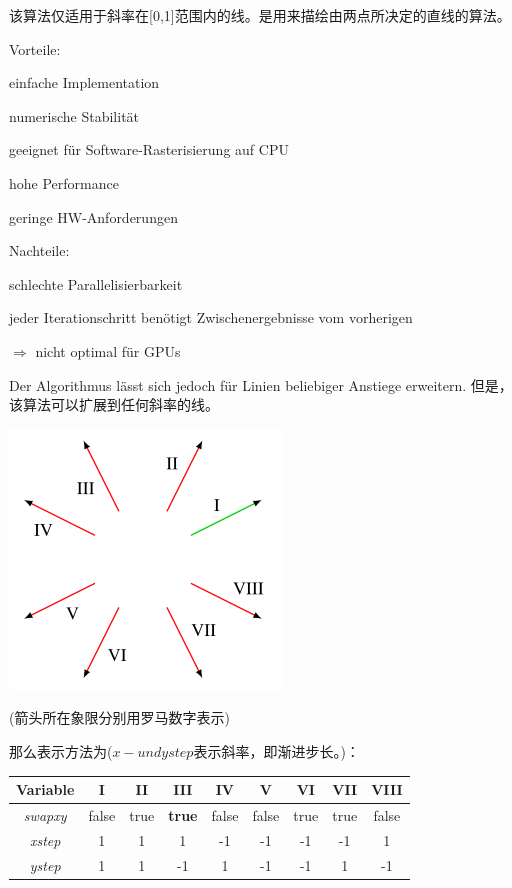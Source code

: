 \documentclass[fleqn]{article}
\begin{document}
\noindent 该算法仅适用于斜率在[0,1]范围内的线。是用来描绘由两点所决定的直线的算法。

\noindent Vorteile:

einfache Implementation 

numerische Stabilität 

geeignet für Software-Rasterisierung auf CPU 

  \indent\indent hohe Performance 

  \indent\indent geringe HW-Anforderungen

\noindent Nachteile:

schlechte Parallelisierbarkeit 

\indent\indent jeder Iterationschritt benötigt Zwischenergebnisse vom vorherigen

\indent\indent\indent $\Rightarrow$ nicht optimal für GPUs

\noindent Der Algorithmus lässt sich jedoch für Linien beliebiger Anstiege erweitern. 但是，该算法可以扩展到任何斜率的线。

\begin{center}
    \includegraphics[scale=0.6]{1.png}
\end{center}

(箭头所在象限分别用罗马数字表示)

那么表示方法为($x- und ystep$表示斜率，即渐进步长。)：

\begin{center}
    \begin{tabular}{c|c|c|c|c|c|c|c|c}
        Variable &I&II&III&IV&V&VI&VII&VIII\\
        \hline
        \hline
        \textit{swapxy}&false&true&\textbf{true}&false&false&true&true&false\\
        \hline
        \textit{xstep}&1&1&1&-1&-1&-1&-1&1\\
        \hline
        \textit{ystep}&1&1&-1&1&-1&-1&1&-1
    \end{tabular}
\end{center}
\end{document}
